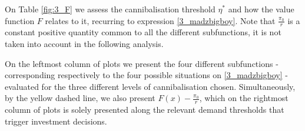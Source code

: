 
On Table \ref{fig:3_F} we assess the cannibalisation threshold $\eta^*$ and how the value function $F$ relates to it, recurring to expression \eqref{3_madzbigboy}. Note that $\frac{\pi_0}{r}$ is a constant positive quantity common to all the different subfunctions, it is not taken into account in the following analysis.

On the leftmost column of plots we present the four different subfunctions - corresponding respectively to the four possible situations on \eqref{3_madzbigboy} - evaluated for the three different levels of cannibalisation chosen. Simultaneously, by the yellow dashed line, we also present $F(x) -\frac{\pi_0}{r}$, which on the rightmost column of plots is solely presented along the relevant demand thresholds that trigger investment decisions.


